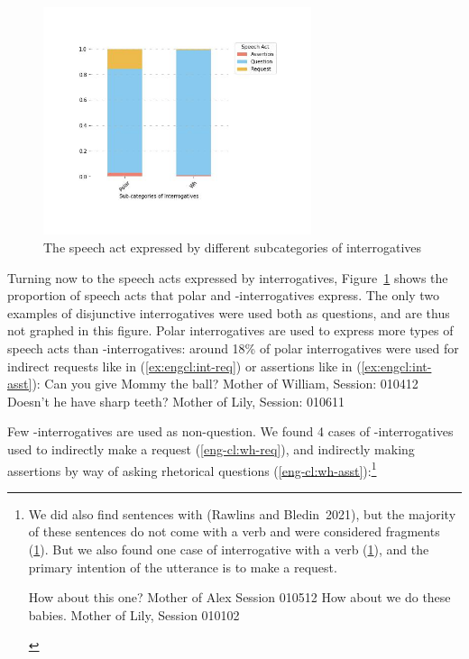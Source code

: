 \begin{figure}[H]
    \centering
    \includegraphics[width=0.7\textwidth]{figures/real-subIsp.jpg}
    \caption{The speech act expressed by different subcategories of interrogatives}
    \label{fig:real-subIsp}
\end{figure}




Turning now to the speech acts expressed by interrogatives, Figure~\ref{fig:real-subIsp} shows the proportion of speech acts that polar and \twh-interrogatives express. The only two examples of disjunctive interrogatives were used both as questions, and are thus not graphed in this figure. Polar interrogatives are used to express more types of speech acts than \twh-interrogatives: around 18\% of polar interrogatives were used for indirect requests like in (\ref{ex:engcl:int-req}) or assertions like in (\ref{ex:engcl:int-asst}):
Can you give Mommy the ball? \hfill Mother of William, Session: 010412
\eex
{}
Doesn’t he have sharp teeth?	\hfill	Mother of Lily, Session: 010611
\eex

Few \twh-interrogatives are used as non-question. We found 4 cases of \twh-interrogatives used to indirectly make a request (\ref{eng-cl:wh-req}), and indirectly making assertions by way of asking rhetorical questions (\ref{eng-cl:wh-asst}):\footnote{We did also find sentences with  (Rawlins and Bledin~2021), but the majority of these sentences do not come with a verb and were considered fragments (\ref{eng-cl:howabout-frag}). But we also found one case of  interrogative with a verb (\ref{eng-cl:howabout-int}), and the primary intention of the utterance is to make a request. 

\begin{xlisti}
\ex \label{eng-cl:howabout-frag} How about this one?	\hfill	Mother of Alex Session 010512
\ex \label{eng-cl:howabout-int} How about we do these babies. \hfill	Mother of Lily, Session 010102
\end{xlisti}
}


